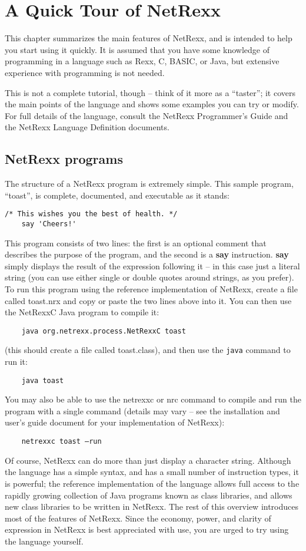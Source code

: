 \chapter{A Quick Tour of NetRexx}
This chapter summarizes the main features of NetRexx, and is intended
to help you start using it quickly. It is assumed that you have some
knowledge of programming in a language such as Rexx, C, BASIC, or
Java, but extensive experience with programming is not needed.

This is not a complete tutorial, though – think of it more as a
“taster”; it covers the main points of the language and shows some
examples you can try or modify. For full details of the language,
consult the NetRexx Programmer's Guide and the NetRexx Language
Definition documents.

\section{NetRexx programs}
The structure of a NetRexx program is extremely simple. This sample
program, “toast”, is complete, documented, and executable as it
stands:
\begin{lstlisting}[label=cheers,caption=Toast]
    /* This wishes you the best of health. */
    say 'Cheers!'
\end{lstlisting}
This program consists of two lines: the first is an optional comment that describes the purpose of the program, and the second is a \textbf{say} instruction. \textbf{say} simply displays the result of the expression following it – in this case just a literal string (you can use either single or double quotes around strings, as you prefer).
To run this program using the reference implementation of NetRexx,
create a file called toast.nrx and copy or paste the two lines above
into it. You can then use the NetRexxC Java program to compile it:
\begin{verbatim}
    java org.netrexx.process.NetRexxC toast
\end{verbatim}
(this should create a file called toast.class), and then use
the \texttt{java} command to run it:
\begin{verbatim}
    java toast
\end{verbatim}
You may also be able to use the netrexxc or nrc command to compile and
run the program with a single command (details may vary – see the
installation and user’s guide document for your implementation of
NetRexx):
\begin{verbatim}
    netrexxc toast –run
\end{verbatim}
Of course, NetRexx can do more than just display a character string. Although the language has a simple syntax, and has a small number of instruction types, it is powerful; the reference implementation of the language allows full access to the rapidly growing collection of Java programs known as class libraries, and allows new class libraries to be written in NetRexx.
The rest of this overview introduces most of the features of NetRexx. Since the economy, power, and clarity of expression in NetRexx is best appreciated with use, you are urged to try using the language yourself.
